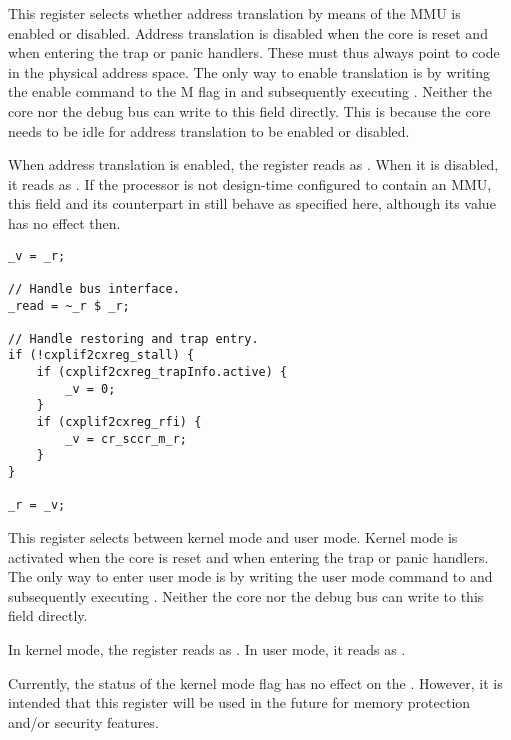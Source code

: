 This register selects whether address translation by means of the MMU is enabled 
or disabled. Address translation is disabled when the core is reset and when 
entering the trap or panic handlers. These must thus always point to code in the 
physical address space. The only way to enable translation is by writing the 
enable command to the M flag in  and subsequently executing 
. Neither the core nor the  debug bus can write to this field 
directly. This is because the core needs to be idle for address translation to 
be enabled or disabled.

When address translation is enabled, the register reads as . When it is
disabled, it reads as . If the processor is not design-time configured
to contain an MMU, this field and its counterpart in  still behave as
specified here, although its value has no effect then.

\declaration{}
\implementation{}
\begin{lstlisting}
_v = _r;

// Handle bus interface.
_read = ~_r $ _r;

// Handle restoring and trap entry.
if (!cxplif2cxreg_stall) {
    if (cxplif2cxreg_trapInfo.active) {
        _v = 0;
    }
    if (cxplif2cxreg_rfi) {
        _v = cr_sccr_m_r;
    }
}

_r = _v;
\end{lstlisting}

This register selects between kernel mode and user mode. Kernel mode is 
activated when the core is reset and when entering the trap or panic handlers. 
The only way to enter user mode is by writing the user mode command to 
 and subsequently executing . Neither the core nor the 
debug bus can write to this field directly.

In kernel mode, the register reads as . In user mode, it reads as 
.

Currently, the status of the kernel mode flag has no effect on the \rvex{}.
However, it is intended that this register will be used in the future for memory
protection and/or security features.

